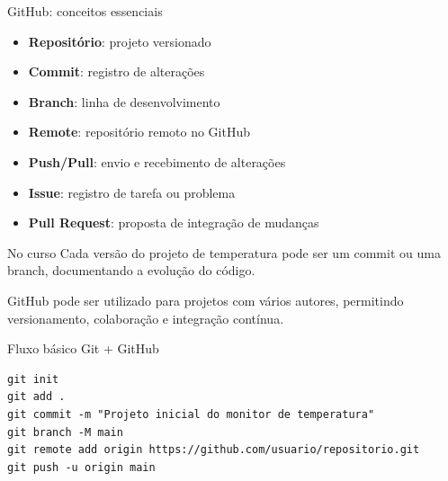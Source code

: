 \documentclass[aspectratio=169]{beamer}
\begin{document}
\begin{frame}{GitHub: conceitos essenciais}
 
    \begin{itemize}
        \item \textbf{Repositório}: projeto versionado
        \item \textbf{Commit}: registro de alterações
        \item \textbf{Branch}: linha de desenvolvimento
        \item \textbf{Remote}: repositório remoto no GitHub
        \item \textbf{Push/Pull}: envio e recebimento de alterações
        \item \textbf{Issue}: registro de tarefa ou problema
        \item \textbf{Pull Request}: proposta de integração de mudanças
    \end{itemize}
    \vfill
    \begin{block}{No curso}
        Cada versão do projeto de temperatura pode ser um commit ou uma branch, documentando a evolução do código.
    \end{block}
    \begin{block}{}
        GitHub pode ser utilizado para projetos com vários autores, permitindo versionamento, colaboração e integração contínua.
    \end{block}
\end{frame}

\begin{frame}[fragile]{Fluxo básico Git + GitHub}
    \centering
    \vfill
    {\footnotesize
    \begin{verbatim}
git init
git add .
git commit -m "Projeto inicial do monitor de temperatura"
git branch -M main
git remote add origin https://github.com/usuario/repositorio.git
git push -u origin main
    \end{verbatim}
    }
\end{frame}
\end{document}
